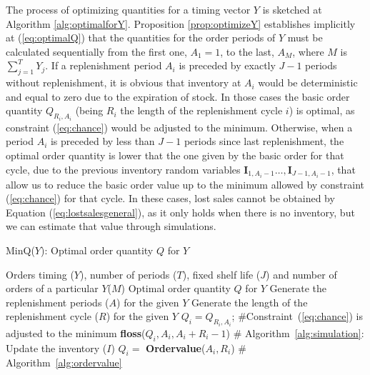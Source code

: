 The process of optimizing quantities for a timing vector $Y$ is sketched at Algorithm \ref{alg:optimalforY}. Proposition \ref{prop:optimizeY} establishes implicitly at (\ref{eq:optimalQ}) that the quantities for the order periods of $Y$ must be calculated sequentially from the first one, $A_1=1$,  to the last, $A_M$, where $M$ is $\sum\limits_{j=1}^{T}Y_j$. If a replenishment period $A_i$ is preceded by exactly $J-1$ periods without replenishment, it is obvious that inventory at $A_i$ would be deterministic and equal to zero due to the expiration of stock. In those cases the basic order quantity $Q_{R_i,A_i}$ (being $R_i$ the length of the replenishment cycle $i$) is optimal, as constraint  (\ref{eq:chance}) would be adjusted to the minimum. Otherwise, when a period $A_i$ is preceded by less than $J-1$ periods since last replenishment, the optimal order quantity is lower that the one given by the basic order for that cycle, due to the previous inventory random variables $\boldsymbol{I}_{1,A_{i}-1}\ldots,\boldsymbol{I}_{J-1,A_{i}-1}$, that allow us to reduce the basic order value up to the minimum allowed by constraint (\ref{eq:chance}) for that  cycle. In these cases, lost sales cannot be obtained by Equation (\ref{eq:lostsalesgeneral}), as it only holds when there is no inventory, but we can estimate that value through simulations.

\begin{algorithm}[!bt]
	\caption{MinQ($Y$): Optimal order quantity $Q$ for $Y$}
	\label{alg:optimalforY}
	\begin{algorithmic}[1]
        \REQUIRE Orders timing ($Y$), number of periods ($T$), fixed shelf life ($J$) and number of orders of a particular $Y$($M$)
        \ENSURE Optimal order quantity $Q$ for $Y$
        \medskip
		\STATE Generate the replenishment periods ($A$) for the given $Y$
        \STATE Generate  the length of the replenishment cycle ($R$) for the given $Y$
		\STATE $Q_i=Q_{R_i,A_i}$; \label{optimalforY:line:beforefloss} \hfill \#Constraint~(\ref{eq:chance}) is adjusted to the minimum
		\STATE  \textbf{floss}($Q_i,A_i,A_i+R_i-1$) \label{optimalforY:line:floss} \hfill \# Algorithm~\ref{alg:simulation}: Update the inventory ($I$)
		\ELSE
        \STATE $Q_i=$ \textbf{Ordervalue}($A_i,R_i$) \hfill \# Algorithm~\ref{alg:ordervalue}
		\ENDIF
		\ENDFOR
		\vskip 5pt
	\end{algorithmic}
	
\end{algorithm}




